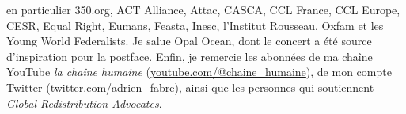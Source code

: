 \documentclass[a5paper,french,openany]{memoir}
\begin{document}
en particulier 350.org, ACT Alliance, Attac, CASCA, CCL France, CCL Europe, CESR, Equal Right, Eumans, Feasta, Inesc, l'Institut Rousseau, Oxfam et les Young World Federalists. Je salue Opal Ocean, dont le concert a été source d'inspiration pour la postface. Enfin, je remercie les abonné\textperiodcentered{}e\textperiodcentered{}s de ma chaîne YouTube \textit{la chaîne humaine} (\href{https://www.youtube.com/@chaine_humaine}{youtube.com/@chaine\_humaine}), de mon compte Twitter (\href{https://twitter.com/adrien_fabre}{twitter.com/adrien\_fabre}), ainsi que les personnes qui soutiennent \textit{Global Redistribution Advocates}.

\pagebreak \vspace*{-2cm}
\listoftables \vspace{-1cm}
\listoffigures
\end{document}
